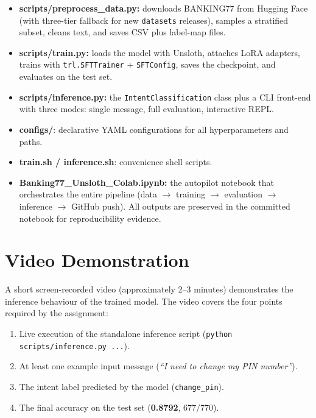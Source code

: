 \documentclass[12pt,a4paper]{article}
\begin{document}
\begin{itemize}[noitemsep]
    \item \textbf{scripts/preprocess\_data.py:} downloads BANKING77 from
          Hugging Face (with three-tier fallback for new \texttt{datasets}
          releases), samples a stratified subset, cleans text, and saves CSV
          plus label-map files.
    \item \textbf{scripts/train.py:} loads the model with Unsloth, attaches
          LoRA adapters, trains with \texttt{trl.SFTTrainer} +
          \texttt{SFTConfig}, saves the checkpoint, and evaluates on the test
          set.
    \item \textbf{scripts/inference.py:} the \texttt{IntentClassification}
          class plus a CLI front-end with three modes: single message,
          full evaluation, interactive REPL.
    \item \textbf{configs/}: declarative YAML configurations for all
          hyperparameters and paths.
    \item \textbf{train.sh / inference.sh}: convenience shell scripts.
    \item \textbf{Banking77\_Unsloth\_Colab.ipynb:} the autopilot notebook
          that orchestrates the entire pipeline (data $\rightarrow$ training
          $\rightarrow$ evaluation $\rightarrow$ inference $\rightarrow$
          GitHub push). All outputs are preserved in the committed notebook
          for reproducibility evidence.
\end{itemize}

\section{Video Demonstration}
\label{sec:video}

A short screen-recorded video (approximately 2--3 minutes) demonstrates the
inference behaviour of the trained model. The video covers the four points
required by the assignment:
\begin{enumerate}[noitemsep]
    \item Live execution of the standalone inference script
          (\texttt{python scripts/inference.py ...}).
    \item At least one example input message (\textit{``I need to change my
          PIN number''}).
    \item The intent label predicted by the model
          (\texttt{change\_pin}).
    \item The final accuracy on the test set
          (\textbf{0.8792}, $677 / 770$).
\end{enumerate}
\end{document}
